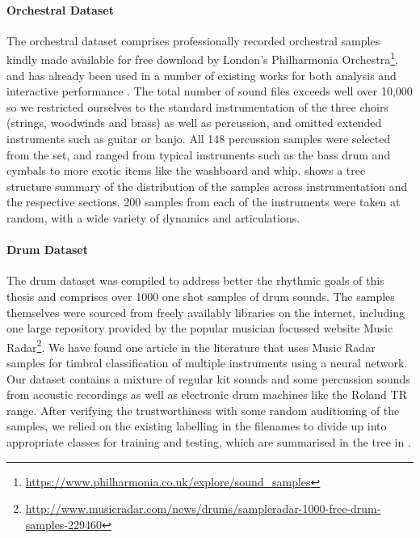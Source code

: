 {{{{\paragraph{Orchestral Dataset}
\label{sec:orch_dataset}

The orchestral dataset comprises professionally recorded orchestral samples kindly made available for free download by London's Philharmonia Orchestra\footnote{\url{https://www.philharmonia.co.uk/explore/sound_samples}}, and has already been used in a number of existing works for both analysis \citep{Hulshof2016, Donnelly2016, Pishdadian2017} and interactive performance \citep{Miller2010}. The total number of sound files exceeds well over 10,000 so we restricted ourselves to the standard instrumentation of the three choirs (strings, woodwinds and brass) as well as percussion, and omitted extended instruments such as guitar or banjo. All 148 percussion samples were selected from the set, and ranged from typical instruments such as the bass drum and cymbals to more exotic items like the washboard and whip.  shows a tree structure summary of the distribution of the samples across instrumentation and the respective sections. 200 samples from each of the instruments were taken at random, with a wide variety of dynamics and articulations.

\paragraph{Drum Dataset}
\label{sec:drum_dataset}

The drum dataset was compiled to address better the rhythmic goals of this thesis and comprises over 1000 one shot samples of drum sounds. The samples themselves were sourced from freely availably libraries on the internet, including one large repository provided by the popular musician focussed website Music Radar\footnote{\url{http://www.musicradar.com/news/drums/sampleradar-1000-free-drum-samples-229460}}. We have found one article in the literature \citep{Masood2015} that uses Music Radar samples for timbral classification of multiple instruments using a neural network. Our dataset contains a mixture of regular kit sounds and some percussion sounds from acoustic recordings as well as electronic drum machines like the Roland TR range. After verifying the trustworthiness with some random auditioning of the samples, we relied on the existing labelling in the filenames to divide up into appropriate classes for training and testing, which are summarised in the tree in .


}}}}
